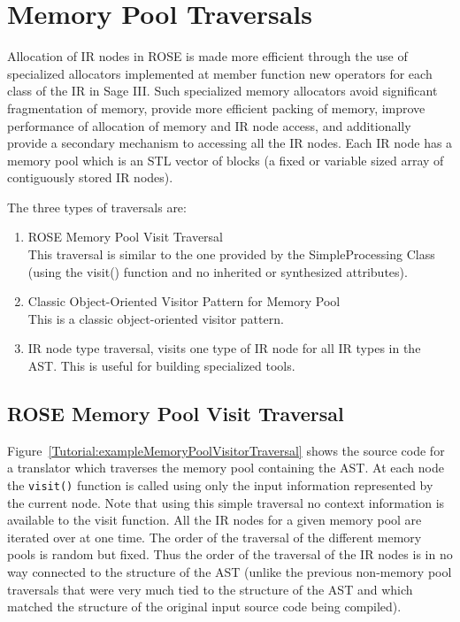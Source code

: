    
\clearpage
\section{Memory Pool Traversals}
\label{Tutorial:memoryPoolTraversals}

   Allocation of IR nodes in ROSE is made more efficient through the
use of specialized allocators implemented at member function new operators
for each class of the IR in Sage III.  Such specialized memory allocators 
avoid significant fragmentation of memory, provide more efficient packing 
of memory, improve performance of allocation of memory and IR node access, and additionally
provide a secondary mechanism to accessing all the IR nodes.  Each IR
node has a memory pool which is an STL vector of blocks (a fixed or variable 
sized array of contiguously stored IR nodes).  

   The three types of traversals are:
\begin{enumerate}
   \item ROSE Memory Pool Visit Traversal \\
         This traversal is similar to the one provided by the SimpleProcessing Class 
    (using the visit() function and no inherited or synthesized attributes).
   \item Classic Object-Oriented Visitor Pattern for Memory Pool \\
         This is a classic object-oriented visitor pattern.
   \item IR node type traversal, visits one type of IR node for all IR types in the AST.
         This is useful for building specialized tools.
\end{enumerate}


\subsection{ROSE Memory Pool Visit Traversal}

Figure~\ref{Tutorial:exampleMemoryPoolVisitorTraversal} shows the source code 
for a translator which traverses the memory pool containing the AST.  At each 
node the {\tt visit()} function is called using only the input information
represented by the current node.  Note that using this simple traversal
no context information is available to the visit function. 
All the IR nodes for a given memory pool are iterated over at one time.
The order of the traversal of the different memory pools is random but fixed.
Thus the order of the traversal of the IR nodes is in no way connected to the
structure of the AST (unlike the previous non-memory pool traversals that were
very much tied to the structure of the AST and which matched the structure of the 
original input source code being compiled).


